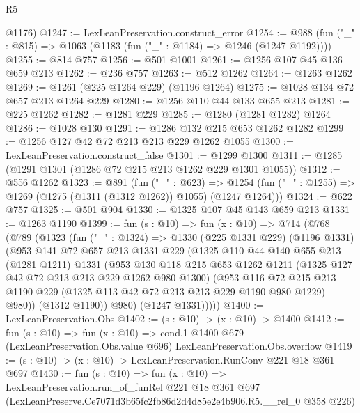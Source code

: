 \begin{lexlean}{R5}
\begin{coremodule}
      @1176)
@1247 := LexLeanPreservation.construct_error
@1254 := @988 (fun ("_" : @815) => @1063 (@1183 (fun ("_" : @1184) => @1246 (@1247 @1192))))
@1255 := @814 @757
@1256 := @501 @1001
@1261 := @1256 @107 @45 @136 @659 @213
@1262 := @236 @757
@1263 := @512 @1262
@1264 := @1263 @1262
@1269 := @1261 (@225 @1264 @229) (@1196 @1264)
@1275 := @1028 @134 @72 @657 @213 @1264 @229
@1280 := @1256 @110 @44 @133 @655 @213
@1281 := @225 @1262
@1282 := @1281 @229
@1285 := @1280 (@1281 @1282) @1264
@1286 := @1028 @130
@1291 := @1286 @132 @215 @653 @1262 @1282
@1299 := @1256 @127 @42 @72 @213 @213 @229 @1262 @1055
@1300 := LexLeanPreservation.construct_false
@1301 := @1299 @1300
@1311 := @1285 (@1291 @1301 (@1286 @72 @215 @213 @1262 @229 @1301 @1055))
@1312 := @556 @1262
@1323 := @891
    (fun ("_" : @623) =>
    @1254 (fun ("_" : @1255) => @1269 (@1275 (@1311 (@1312 @1262)) @1055) (@1247 @1264)))
@1324 := @622 @757
@1325 := @501 @904
@1330 := @1325 @107 @45 @143 @659 @213
@1331 := @1263 @1190
@1399 := fun (s : @10) =>
  fun (x : @10) =>
  @714
    (@768
      (@789
        (@1323
          (fun ("_" : @1324) =>
          @1330
            (@225 @1331 @229)
            (@1196 @1331)
            (@953
              @141
              @72
              @657
              @213
              @1331
              @229
              (@1325
                @110
                @44
                @140
                @655
                @213
                (@1281 @1211)
                @1331
                (@953
                  @130
                  @118
                  @215
                  @653
                  @1262
                  @1211
                  (@1325 @127 @42 @72 @213 @213 @229 @1262 @980 @1300)
                  (@953
                    @116
                    @72
                    @215
                    @213
                    @1190
                    @229
                    (@1325 @113 @42 @72 @213 @213 @229 @1190 @980 @1229)
                    @980))
                (@1312 @1190))
              @980)
            (@1247 @1331)))))
@1400 := LexLeanPreservation.Obs
@1402 := (s : @10) -> (x : @10) -> @1400
@1412 := fun (s : @10) =>
  fun (x : @10) =>
  cond.{1} @1400 @679 (LexLeanPreservation.Obs.value @696) LexLeanPreservation.Obs.overflow
@1419 := (s : @10) -> (x : @10) -> LexLeanPreservation.RunConv @221 @18 @361 @697
@1430 := fun (s : @10) =>
  fun (x : @10) =>
  LexLeanPreservation.run_of_funRel
    @221
    @18
    @361
    @697
    (LexLeanPreserve.Ce7071d3b65fc2fb86d2d4d85e2e4b906.R5.__rel_0 @358 @226)
\end{coremodule}
\end{lexlean}
